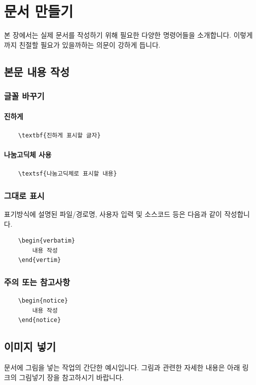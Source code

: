 
\chapter{문서 만들기} 
본 장에서는 실제 문서를 작성하기 위해 필요한 다양한 명령어들을 소개합니다. 이렇게까지 친절할 필요가
있을까하는 의문이 강하게 듭니다.

\section{본문 내용 작성}
\subsection{글꼴 바꾸기}
\subsubsection{진하게}
\begin{verbatim}
    \textbf{진하게 표시할 글자}
\end{verbatim}

\subsubsection{나눔고딕체 사용}
\begin{verbatim}
    \textsf{나눔고딕체로 표시할 내용}
\end{verbatim}

\subsection{그대로 표시}
표기방식에 설명된 파일/경로명, 사용자 입력 및 소스코드 등은 다음과 같이 작성합니다.
\begin{verbatim}
    \begin{verbatim}
        내용 작성
    \end{vertim}
\end{verbatim}

\subsection{주의 또는 참고사항}
\begin{verbatim}
    \begin{notice}
        내용 작성
    \end{notice}
\end{verbatim}

\section{이미지 넣기}
문서에 그림을 넣는 작업의 간단한 예시입니다. 그림과 관련한 자세한 내용은 아래 링크의 그림넣기 장을
참고하시기 바랍니다. \\

